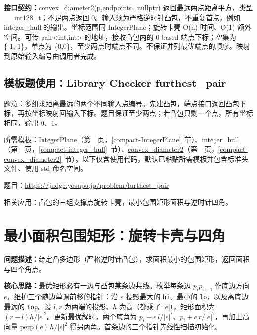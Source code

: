 {\sloppy{}\noindent\textbf{接口契约：}convex\_diameter2(p,endpoints=nullptr) 返回最远两点距离平方，类型 \_\_int128\_t；不足两点返回 0。输入须为严格逆时针凸包，不重复首点，例如 integer\_hull 的输出。坐标范围同 IntegerPlane；旋转卡壳 O(n) 时间、O(1) 额外空间。可传 pair<int,int> 的地址，接收凸包内的 0-based 端点下标；空集为 \{-1,-1\}，单点为 \{0,0\}，至少两点时端点不同。不保证并列最优端点的顺序。映射到原始输入编号由调用者完成。\par}



\Needspace{485pt}

\subsection*{模板题使用：Library Checker furthest\_pair}

\label{usage-example-65}

题意：多组求距离最远的两个不同输入点编号。先建凸包，端点接口返回凸包下标，再按坐标映射回输入下标。题目保证至少两点；若凸包只剩一个点，所有坐标相同，输出 0、1。

所需模板：\hyperref[compact-IntegerPlane]{IntegerPlane}（第~\pageref{compact-IntegerPlane}~页，\ref{compact-IntegerPlane}~节）、\hyperref[compact-integer_hull]{integer\_\allowbreak{}hull}（第~\pageref{compact-integer_hull}~页，\ref{compact-integer_hull}~节）、\hyperref[compact-convex_diameter2]{convex\_\allowbreak{}diameter2}（第~\pageref{compact-convex_diameter2}~页，\ref{compact-convex_diameter2}~节）。以下仅含使用代码，默认已粘贴所需模板并包含标准头文件、使用 std 命名空间。

题目：\url{https://judge.yosupo.jp/problem/furthest_pair}



\newpage

\noindent 相关应用：凸包的三组支撑点旋转卡壳，最小包围矩形面积与逆时针四角。

\section{最小面积包围矩形：旋转卡壳与四角}\label{compact-minimum_rectangle}

\noindent\textbf{问题描述：}\allowbreak 给定凸多边形（严格逆时针凸包），求面积最小的包围矩形，返回面积与四个角点。

\textbf{核心思路：}\allowbreak 最优矩形必有一边与凸包某条边共线。枚举每条边 $p_ip_{i+1}$ 作底边方向 $e$，维护三个随边单调前移的指针：沿 $e$ 投影最大的 \texttt{hi}、最小的 \texttt{lo}，以及离底边最远的 \texttt{top}。设 $l,r$ 为两端的投影、$h$ 为高（都乘了 $|e|$），矩形面积为 $(r-l)h/|e|^2$。更新最优解时，两个底角为 $p_i+e\,l/|e|^2$、$p_i+e\,r/|e|^2$，再加上高向量 $\mathrm{perp}(e)\,h/|e|^2$ 得另两角。首条边的三个指针先线性扫描初始化。

